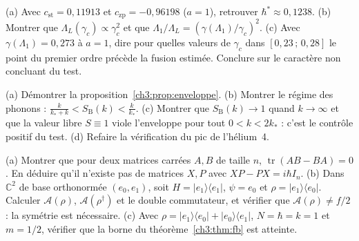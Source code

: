 \begin{exercise}\label{ch3:ex:lind}
(a) Avec $c_{\mathrm{st}}=0{,}11913$ et $c_{\mathrm{zp}}=-0{,}96198$ ($a=1$), retrouver $\hbar^*\approx0{,}1238$.
(b) Montrer que $\Lambda_L(\gamma_c)\propto\gamma_c^2$ et que $\Lambda_1/\Lambda_L=(\gamma(\Lambda_1)/\gamma_c)^2$.
(c) Avec $\gamma(\Lambda_1)=0{,}273$ à $a=1$, dire pour quelles valeurs de $\gamma_c$ dans $[0{,}23\,;\,0{,}28]$ le point du
premier ordre précède la fusion estimée. Conclure sur le caractère non concluant du test.
\end{exercise}

\begin{exercise}\label{ch3:ex:bog}
(a) Démontrer la proposition~\ref{ch3:prop:enveloppe}. (b) Montrer le régime des phonons :
$\frac{k}{k_*+k}<S_{\mathrm B}(k)<\frac{k}{k_*}$. (c) Montrer que $S_{\mathrm B}(k)\to1$ quand $k\to\infty$ et que la valeur
libre $S\equiv1$ viole l'enveloppe pour tout $0<k<2k_*$ : c'est le contrôle positif du test. (d) Refaire la vérification
du pic de l'hélium~4.
\end{exercise}

\begin{exercise}\label{ch3:ex:trace}
(a) Montrer que pour deux matrices carrées $A,B$ de taille $n$, $\operatorname{tr}(AB-BA)=0$. En déduire qu'il n'existe
pas de matrices $X,P$ avec $XP-PX=i\hbar I_n$. (b) Dans $\mathbb{C}^2$ de base orthonormée $(e_0,e_1)$, soit
$H=|e_1\rangle\langle e_1|$, $\psi=e_0$ et $\rho=|e_1\rangle\langle e_0|$. Calculer $\mathcal A(\rho)$,
$\mathcal A(\rho^\dagger)$ et le double commutateur, et vérifier que $\mathcal A(\rho)\ne f/2$ : la symétrie est
nécessaire. (c) Avec $\rho=|e_1\rangle\langle e_0|+|e_0\rangle\langle e_1|$, $N=\hbar=k=1$ et $m=1/2$, vérifier que la
borne du théorème~\ref{ch3:thm:fb} est atteinte.
\end{exercise}

\label{ch3:fin}
